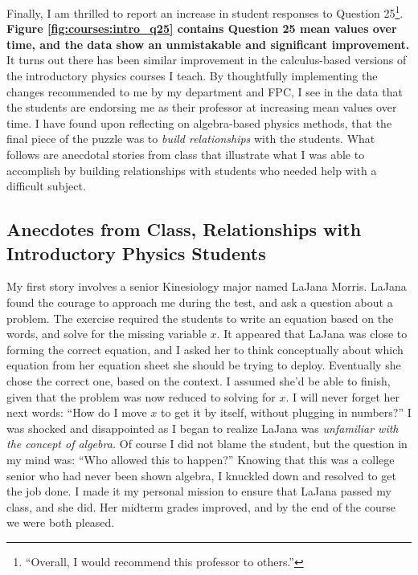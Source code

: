 \documentclass[../../main.tex]{subfiles}
\begin{document}
Finally, I am thrilled to report an increase in student responses to Question 25\footnote{``Overall, I would recommend this professor to others.''}. \textbf{Figure \ref{fig:courses:intro_q25} contains Question 25 mean values over time, and the data show an unmistakable and significant improvement.}  It turns out there has been similar improvement in the calculus-based versions of the introductory physics courses I teach.  By thoughtfully implementing the changes recommended to me by my department and FPC, I see in the data that the students are endorsing me as their professor at increasing mean values over time.  I have found upon reflecting on algebra-based physics methods, that the final piece of the puzzle was to \textit{build relationships} with the students.  What follows are anecdotal stories from class that illustrate what I was able to accomplish by building relationships with students who needed help with a difficult subject.  \\ \hspace{0.1cm}

\subsection{Anecdotes from Class, Relationships with Introductory Physics Students}

My first story involves a senior Kinesiology major named LaJana Morris.  LaJana found the courage to approach me during the test, and ask a question about a problem.  The exercise required the students to write an equation based on the words, and solve for the missing variable $x$.  It appeared that LaJana was close to forming the correct equation, and I asked her to think conceptually about which equation from her equation sheet she should be trying to deploy.  Eventually she chose the correct one, based on the context.  I assumed she'd be able to finish, given that the problem was now reduced to solving for $x$.  I will never forget her next words: ``How do I move $x$ to get it by itself, without plugging in numbers?''  I was shocked and disappointed as I began to realize LaJana was \textit{unfamiliar with the concept of algebra.}  Of course I did not blame the student, but the question in my mind was: ``Who allowed this to happen?''  Knowing that this was a college senior who had never been shown algebra, I knuckled down and resolved to get the job done.  I made it my personal mission to ensure that LaJana passed my class, and she did.  Her midterm grades improved, and by the end of the course we were both pleased.  \\ \hspace{0.1cm}
\end{document}
